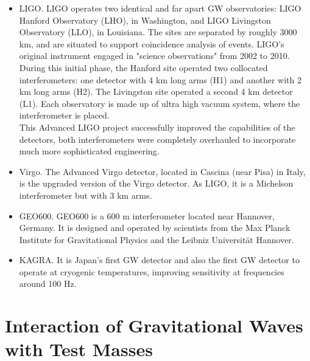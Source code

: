 \documentclass[binding=0.6cm, LaM]{sapthesis}
\begin{document}
	\begin{itemize}
		\item LIGO. LIGO operates two identical and far apart GW observatories: 
			    LIGO Hanford Observatory (LHO), in Washington, and LIGO Livingston Observatory (LLO), in Louisiana.
			    The sites are separated by roughly 3000 km, 
		   	    and are situated to support coincidence analysis of events.
		       	    LIGO's original instrument engaged in "science observations" from 2002 to 2010. 
			    During this initial phase, the Hanford site operated two collocated interferometers:
			    one detector with 4 km long arms (H1) and another with 2 km long arms (H2). 
			    The Livingston site operated a second 4 km detector (L1). 
			    Each observatory is made up of ultra high vacuum system, 
			    where the interferometer is placed. \\
			    This Advanced LIGO project successfully improved the capabilities of the detectors, 
			    both interferometers were completely overhauled to incorporate much more sophisticated engineering.
		\item Virgo. The Advanced Virgo detector, located in Cascina (near Pisa) in Italy, 
			     is the upgraded version of the Virgo detector. 
			     As LIGO, it is a Michelson interferometer but with 3 km arms.
                 \item GEO600. GEO600 is a 600 m interferometer located near Hannover,
                 	       Germany. It is designed and operated by scientists from the
                               Max Planck Institute for Gravitational Physics and the Leibniz Universität Hannover.
                  \item KAGRA. It is Japan’s first GW detector and also the first GW detector to operate
			       at cryogenic temperatures, improving sensitivity at frequencies around 100 Hz.

\end{itemize}

\section{Interaction of Gravitational Waves with Test Masses}
	
\end{document}
